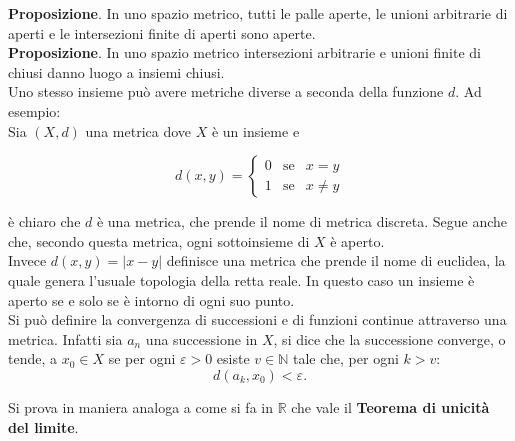 \documentclass[a4paper,twoside]{article}
\renewcommand{\epsilon}{\varepsilon}
\newcommand{\N}{\mathbb{N}}
\newcommand{\R}{\mathbb{R}}
\theoremstyle{definition}
\numberwithin{theorem}{section}
\begin{document}
\textbf{Proposizione}. In uno spazio metrico, tutti le palle aperte, le unioni arbitrarie di aperti e le intersezioni finite di aperti sono aperte.\\
\textbf{Proposizione}. In uno spazio metrico intersezioni arbitrarie e unioni finite di chiusi danno luogo a insiemi chiusi.\\

Uno stesso insieme può avere metriche diverse a seconda della funzione $d$. Ad esempio: \\
Sia $(X,d)$ una metrica dove $X$ è un insieme e

$$ d(x,y)=\left\{\begin{array}{ccl} 0 &\text{se} & x=y\\ 1 &\text{se} & x\neq y\end{array}\right. $$

è chiaro che $d$ è una metrica, che prende il nome di metrica discreta. Segue anche che, secondo questa metrica, ogni sottoinsieme di $X$ è aperto.\\
Invece $d(x,y)=|x-y|$ definisce una metrica che prende il nome di euclidea, la quale genera l'usuale topologia della retta reale. In questo caso un insieme è aperto se e solo se è intorno di ogni suo punto.\\
Si può definire la convergenza di successioni e di funzioni continue attraverso una metrica. Infatti sia $a_n$ una successione in $X$, si dice che la successione converge, o tende, a $x_0\in X$ se per ogni $\epsilon>0$ esiste $v\in \N$ tale che, per ogni $k>v$: \\
$$d(a_k,x_0)<\epsilon.$$

Si prova in maniera analoga a come si fa in $\R$ che vale il \textbf{Teorema di unicità del limite}.
\end{document}
